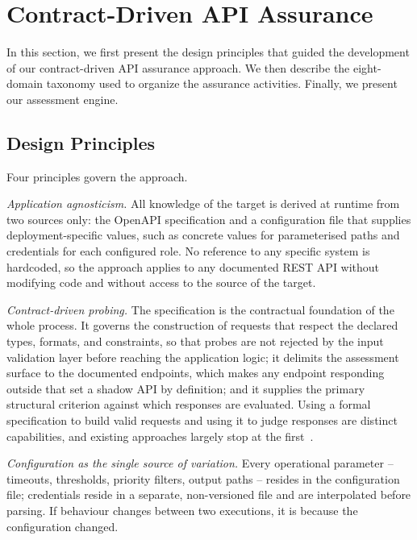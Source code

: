 \section{Contract-Driven API Assurance}
\label{sec:method}

In this section, we first present the design principles that guided the development of our contract-driven API assurance approach. We then describe the eight-domain taxonomy used to organize the assurance activities. Finally, we present our assessment engine.

\subsection{Design Principles}
\label{sec:principles}

Four principles govern the approach.

\emph{Application agnosticism.} All knowledge of the target is derived at runtime from two sources only: the OpenAPI specification and a configuration file that supplies deployment-specific values, such as concrete values for parameterised paths and credentials for each configured role.
No reference to any specific system is hardcoded, so the approach applies to any documented REST API without modifying code and without access to the source of the target.

\emph{Contract-driven probing.} The specification is the contractual foundation of the whole process.
It governs the construction of requests that respect the declared types, formats, and constraints, so that probes are not rejected by the input validation layer before reaching the application logic; it delimits the assessment surface to the documented endpoints, which makes any endpoint responding outside that set a shadow API by definition; and it supplies the primary structural criterion against which responses are evaluated.
Using a formal specification to build valid requests and using it to judge responses are distinct capabilities, and existing approaches largely stop at the first~\cite{atlidakisRESTlerStatefulREST2019a}.

\emph{Configuration as the single source of variation.} Every operational parameter -- timeouts, thresholds, priority filters, output paths -- resides in the configuration file; credentials reside in a separate, non-versioned file and are interpolated before parsing.
If behaviour changes between two executions, it is because the configuration changed.

